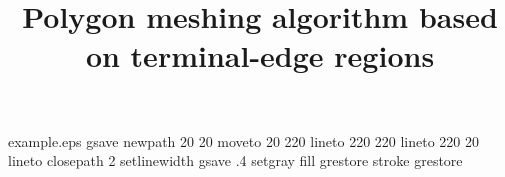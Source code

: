 %
%
%
%
%
\begin{filecontents*}{example.eps}
gsave
newpath
  20 20 moveto
  20 220 lineto 
  220 220 lineto
  220 20 lineto
closepath
2 setlinewidth
gsave
  .4 setgray fill
grestore
stroke
grestore
\end{filecontents*}
%
\RequirePackage{fix-cm}
%
\documentclass[smallextended]{svjour3}       %
%
\smartqed  %
%
\usepackage{graphicx}
%
%
\usepackage{subfigure} %
\usepackage{svg}
\usepackage{caption}
\usepackage{geometry}
\usepackage{amsmath,amssymb}
\usepackage{listings}
\usepackage{xcolor}
\usepackage{mdframed} %
\usepackage[shortlabels]{enumitem} %
\usepackage{setspace}

%
%




\title{Polygon meshing algorithm based on terminal-edge regions}%

